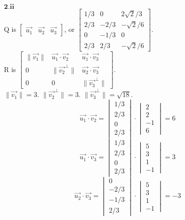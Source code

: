\documentclass[letterpaper,12pt]{article}
\begin{document}
\\
\\$\mathbf{2.ii}$
\\ Q is 
$\begin{bmatrix}
\vec{u_1} & \vec{u_2} & \vec{u_3}
\end{bmatrix}$, or 
$\begin{bmatrix}
1/3 & 0 & 2 \sqrt{2} / 3 \\
2/3 & -2/3 & - \sqrt{2} / 6 \\
0 & -1/3 & 0 \\
2/3 & 2/3 & -\sqrt{2} / 6
\end{bmatrix}$.
\\R is 
$\begin{bmatrix}
\| \vec{v_1} \| & \vec{u_1} \cdot \vec{v_2} & \vec{u_1} \cdot \vec{v_3} \\
0 & \| \vec{v_2}^{\perp} \| & \vec{u_2} \cdot \vec{v_3} \\
0 & 0 & \| \vec{v_3}^{\perp} \|
\end{bmatrix}$.
\\ $\| \vec{v_1} \| = 3$. $\| \vec{v_2}^{\perp}  \| = 3$. $\| \vec{v_3}^{\perp}  \| = \sqrt{18}$.
\begin{equation*}
\vec{u_1} \cdot \vec{v_2} =
\begin{vmatrix}
1/3 \\
2/3 \\
0 \\
2/3
\end{vmatrix}
\cdot
\begin{vmatrix}
2 \\
2 \\
-1 \\
6
\end{vmatrix}
= 6
\end{equation*}
\begin{equation*}
\vec{u_1} \cdot \vec{v_3} =
\begin{vmatrix}
1/3 \\
2/3 \\
0 \\
2/3
\end{vmatrix}
\cdot
\begin{vmatrix}
5 \\
3 \\
1 \\
-1
\end{vmatrix}
= 3
\end{equation*}
\begin{equation*}
\vec{u_2} \cdot \vec{v_3} =
\begin{vmatrix}
0 \\
-2/3 \\
-1/3 \\
2/3
\end{vmatrix}
\cdot
\begin{vmatrix}
5 \\
3 \\
1 \\
-1
\end{vmatrix}
=
-3
\end{equation*}
\end{document}
